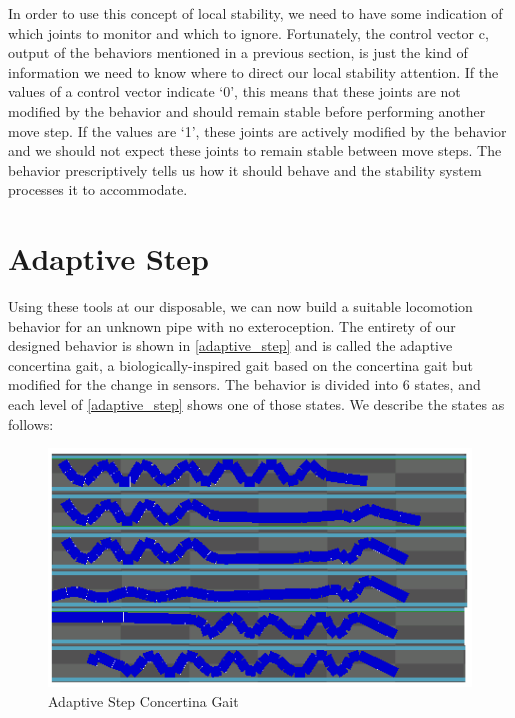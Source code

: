 In order to use this concept of local stability, we need to have some indication of which joints to monitor and which to ignore. Fortunately, the control vector c, output of the behaviors mentioned in a previous section, is just the kind of information we need to know where to direct our local stability attention. If the values of a control vector indicate `0', this means that these joints are not modified by the behavior and should remain stable before performing another move step. If the values are `1', these joints are actively modified by the behavior and we should not expect these joints to remain stable between move steps. The behavior prescriptively tells us how it should behave and the stability system processes it to accommodate.

\section{Adaptive Step}
\label{adaptivestep}





Using these tools at our disposable, we can now build a suitable locomotion behavior for an unknown pipe with no exteroception. The entirety of our designed behavior is shown in \autoref{adaptive_step} and is called the adaptive concertina gait, a biologically-inspired gait based on the concertina gait but modified for the change in sensors. The behavior is divided into 6 states, and each level of \autoref{adaptive_step} shows one of those states. We describe the states as follows:

\begin{figure}[htbp]
\centering
\includegraphics[keepaspectratio,width=400pt,height=0.75\textheight]{AdaptiveStep.png}
\caption{Adaptive Step Concertina Gait}
\label{adaptive_step}
\end{figure}



